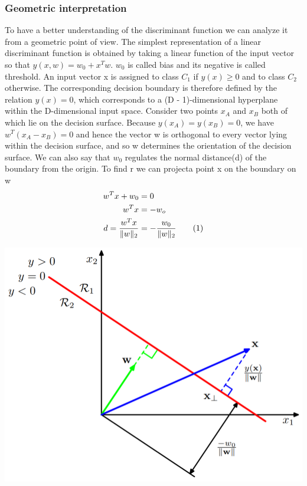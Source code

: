 \documentclass[main.tex]{subfiles}
\newcommand\numberthis{\addtocounter{equation}{1}\tag{\theequation}}
\begin{document}
\subsubsection{Geometric interpretation}
To have a better understanding of the discriminant function we can analyze it from a geometric point of view. The simplest representation of a linear discriminant function is obtained by taking a linear function of the input vector so that $y(x,w) = w_0 + x^Tw$. $w_0$ is called bias and its negative is called threshold. An input vector x is assigned to class $C_1$ if $y(x) \geq 0$ and to class $C_2$ otherwise. The corresponding decision boundary is therefore defined by the relation $y(x)=0$, which corresponds to a (D - 1)-dimensional hyperplane within the D-dimensional input space. Consider two points $x_A$ and $x_B$ both of which lie on the decision surface.
Because $y(x_A) = y(x_B)=0$, we have $w^T(x_A -x_B)=0$ and hence the vector w is orthogonal to every vector lying within the decision surface\footnotemark, and so w determines the
orientation of the decision surface.
We can also say that $w_0$ regulates the normal distance(d) of the boundary from the origin. To find r we can project\footnotemark a point x on the boundary on w
\begin{align*}
    w^Tx + w_0               & = 0                                \\
    w^Tx                     & = -w_o                             \\
    d = \frac{w^Tx}{\|w\|_2} & = -\frac{w_0}{\|w\|_2} \numberthis
\end{align*}
\begin{center}
    \includegraphics[scale=0.6]{img/Linearboundary.PNG}
\end{center}
\end{document}
